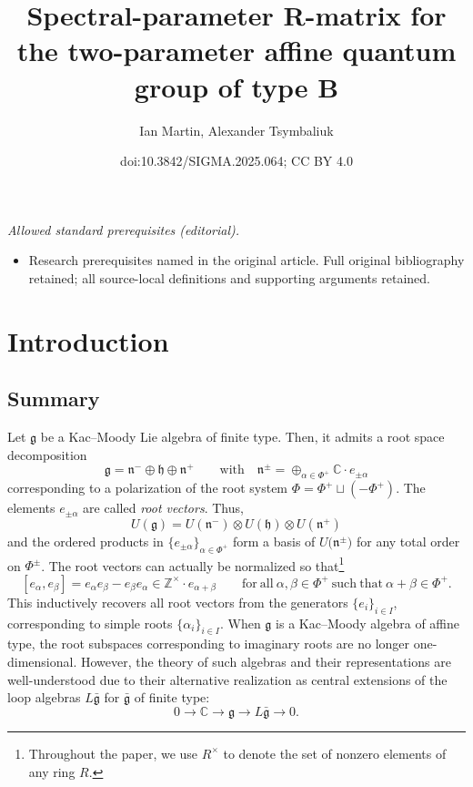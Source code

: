 \documentclass[10pt,a4paper]{amsart}
\title{Spectral-parameter R-matrix for the two-parameter affine quantum group of type B}
\author{Ian Martin, Alexander Tsymbaliuk}
\date{doi:10.3842/SIGMA.2025.064; CC BY 4.0}
\numberwithin{equation}{section}
\newcommand{\fg}{\mathfrak{g}}
\newcommand{\fn}{\mathfrak{n}}
\newcommand{\fh}{\mathfrak{h}}
\newcommand{\BZ}{\mathbb{Z}}
\newcommand{\BC}{\mathbb{C}}
\begin{document}
\maketitle
\noindent\textit{Allowed standard prerequisites (editorial).}\begin{itemize}
\item Research prerequisites named in the original article. Full original bibliography retained; all source-local definitions and supporting arguments retained.
\end{itemize}\medskip
\section{Introduction}%

\subsection{Summary}%

Let $\fg$ be a Kac--Moody Lie algebra of finite type. Then, it admits a root space decomposition
\[
\fg=\fn^- \oplus \fh \oplus \fn^+ \qquad \text{with}\quad \fn^{\pm}=\oplus_{\alpha\in \Phi^+} \BC\cdot e_{\pm \alpha}
\]
 corresponding to a polarization of the root system $\Phi=\Phi^+ \sqcup (-\Phi^+)$. The elements $e_{\pm \alpha}$ are called \textit{root vectors}. Thus,
 \[
 U(\fg)=U(\fn^-) \otimes U(\fh) \otimes U(\fn^+)
 \]
 and the ordered products in $\{e_{\pm \alpha}\}_{\alpha\in \Phi^+}$ form a basis of $U\bigl(\fn^\pm\bigr)$ for any total order on $\Phi^\pm$. The root vectors can actually be normalized so that\footnote{Throughout the paper, we use $R^\times$ to denote the set of nonzero elements of any ring $R$.}
\begin{equation}\label{eqn:Lie-root-vectors}
 [e_{\alpha},e_{\beta}] = e_{\alpha}e_{\beta}-e_{\beta}e_{\alpha} \in \BZ^\times \cdot e_{\alpha+\beta}
 \qquad \mathrm{for\ all} \ \alpha, \beta \in \Phi^+ \ \mathrm{such\ that} \ \alpha+\beta \in \Phi^+.
\end{equation}
This inductively recovers all root vectors from the generators $\{e_i\}_{i\in I}$, corresponding to simple roots $\{\alpha_i\}_{i\in I}$. When $\fg$ is a Kac--Moody algebra of affine type, the root subspaces corresponding to imaginary roots are no longer one-dimensional. However, the theory of such algebras and their representations are well-understood due to their alternative realization as central extensions of the loop algebras $L\bar{\fg}$ for $\bar{\fg}$ of finite type:
\begin{equation}\label{eq:affLie-loop}
 0\to \BC \to \fg\to L\bar{\fg}\to 0.
\end{equation}
\end{document}
